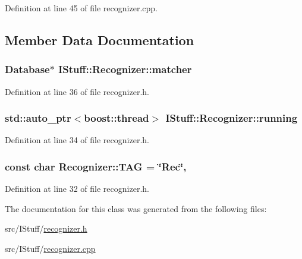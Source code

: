 Definition at line 45 of file recognizer.\-cpp.



\subsection{Member Data Documentation}
\hypertarget{class_i_stuff_1_1_recognizer_afaba7db86af7bbf83f12472b7fc11e93}{
\subsubsection[{matcher}]{\setlength{\rightskip}{0pt plus 5cm}Database$\ast$ I\-Stuff\-::\-Recognizer\-::matcher\hspace{0.3cm}{\ttfamily [private]}}}\label{class_i_stuff_1_1_recognizer_afaba7db86af7bbf83f12472b7fc11e93}


Definition at line 36 of file recognizer.\-h.

\hypertarget{class_i_stuff_1_1_recognizer_a9460f3d799e5a46ee9861f177e0d9988}{
\subsubsection[{running}]{\setlength{\rightskip}{0pt plus 5cm}std\-::auto\-\_\-ptr$<$boost\-::thread$>$ I\-Stuff\-::\-Recognizer\-::running\hspace{0.3cm}{\ttfamily [private]}}}\label{class_i_stuff_1_1_recognizer_a9460f3d799e5a46ee9861f177e0d9988}


Definition at line 34 of file recognizer.\-h.

\hypertarget{class_i_stuff_1_1_recognizer_a90ec5deceaef320be5e825f653dcf7f1}{
\subsubsection[{T\-A\-G}]{\setlength{\rightskip}{0pt plus 5cm}const char Recognizer\-::\-T\-A\-G = \char`\"{}Rec\char`\"{}\hspace{0.3cm}{\ttfamily [static]}, {\ttfamily [private]}}}\label{class_i_stuff_1_1_recognizer_a90ec5deceaef320be5e825f653dcf7f1}


Definition at line 32 of file recognizer.\-h.



The documentation for this class was generated from the following files\-:\begin{DoxyCompactItemize}
\item 
src/\-I\-Stuff/\hyperlink{recognizer_8h}{recognizer.\-h}\item 
src/\-I\-Stuff/\hyperlink{recognizer_8cpp}{recognizer.\-cpp}\end{DoxyCompactItemize}
